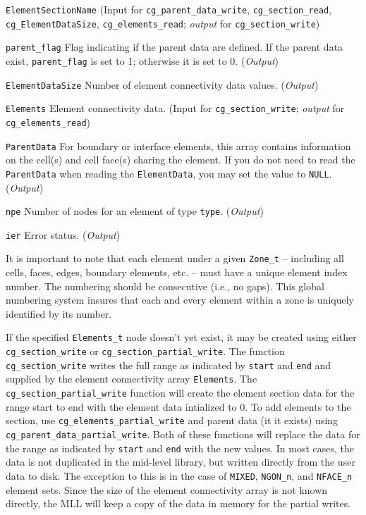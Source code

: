 \begin{Ventryi}{\texttt{ElementSectionName}}
      (\textcolor{input}{Input} for \texttt{cg\_parent\_data\_write},
      \texttt{cg\_section\_read}, \texttt{cg\_ElementDataSize},
      \texttt{cg\_elements\_read};
      \textcolor{output}{\textit{output}} for \texttt{cg\_section\_write})
\item [\texttt{parent\_flag}]
      Flag indicating if the parent data are defined.
      If the parent data exist, \texttt{parent\_flag} is set to 1;
      otherwise it is set to 0.
      (\textcolor{output}{\textit{Output}})
\item [\texttt{ElementDataSize}]
      Number of element connectivity data values.
      (\textcolor{output}{\textit{Output}})
\item [\texttt{Elements}]
      Element connectivity data.
      (\textcolor{input}{Input} for \texttt{cg\_section\_write};
      \textcolor{output}{\textit{output}} for \texttt{cg\_elements\_read})
\item [\texttt{ParentData}]
      For boundary or interface elements, this array contains
      information on the cell(s) and cell face(s) sharing the element.
      If you do not need to read the \texttt{ParentData} when reading
      the \texttt{ElementData}, you may set the value to \texttt{NULL}.
      (\textcolor{output}{\textit{Output}})
\item [\texttt{npe}]
      Number of nodes for an element of type \texttt{type}.
      (\textcolor{output}{\textit{Output}})
\item [\texttt{ier}]
      Error status.
      (\textcolor{output}{\textit{Output}})
\end{Ventryi}

It is important to note that each element under a given \texttt{Zone\_t} -- including
all cells, faces, edges, boundary elements, etc. -- must have a unique element index
number. The numbering should be consecutive (i.e., no gaps).
This global numbering system insures that each and every element
within a zone is uniquely identified by its number.

If the specified \texttt{Elements\_t} node doesn't yet exist,
it may be created using either \texttt{cg\_sec\-tion\_write} or
\texttt{cg\_section\_partial\_write}.
The function \texttt{cg\_section\_write} writes the full range as
indicated by \texttt{start} and \texttt{end}
and supplied by the element connectivity array \texttt{Elements}. The 
\texttt{cg\_section\_partial\_write} function will create the element 
section data for the range start to end with the element data intialized 
to $0$. To add elements to the section, use \texttt{cg\_elements\_partial\_write} 
and parent data (it it exists) using \texttt{cg\_parent\_data\_partial\_write}. 
Both of these functions will replace the data for the range as indicated by 
\texttt{start} and \texttt{end} with the new values. In most cases, the data is 
not duplicated in the mid-level library, but written directly from the user data 
to disk. The exception to this is in the case of \texttt{MIXED}, 
\texttt{NGON\_n}, and \texttt{NFACE\_n} element sets. Since the size of the 
element connectivity array is not known directly, the MLL will keep a copy 
of the data in memory for the partial writes.

